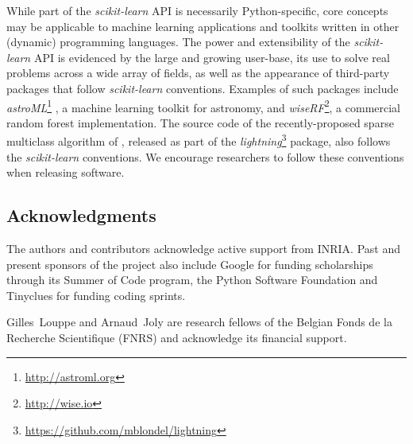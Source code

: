 \documentclass[twocolumn]{article}
\newcommand{\sklearn}{\textit{scikit-learn}\xspace}
\DeclareRobustCommand{\VAN}[3]{#2}
\begin{document}
While part of the \sklearn API is necessarily Python-specific,
core concepts may be applicable to
machine learning applications and toolkits
written in other (dynamic) programming languages.
The power and extensibility of the \sklearn API is evidenced
by the large and growing user-base, its use to solve real
problems across a wide array of fields,
as well as the appearance of third-party packages
that follow \sklearn conventions. Examples of such packages include
\textit{astroML}\footnote{\url{http://astroml.org}}
\citep{vanderplas2012astroML}, a machine learning toolkit for astronomy,
and \textit{wiseRF}\footnote{\url{http://wise.io}}, a commercial random forest
implementation. The source code of the recently-proposed sparse multiclass
algorithm of \citet{mblondel-mlj2013}, released as part of the
\textit{lightning}\footnote{\url{https://github.com/mblondel/lightning}}
package, also follows the \sklearn conventions.
We encourage researchers to follow these conventions when releasing software.

\subsection*{Acknowledgments}

The authors and contributors acknowledge active support from INRIA\@. Past and
present sponsors of the project also include Google for funding
scholarships through its Summer of Code program,
the Python Software Foundation and Tinyclues for funding coding sprints.

Gilles~Louppe and Arnaud~Joly are research fellows of the Belgian
Fonds de la Recherche Scientifique (FNRS)
and acknowledge its financial support.

{\small

\DeclareRobustCommand{\VAN}[3]{#3}

}
\end{document}
